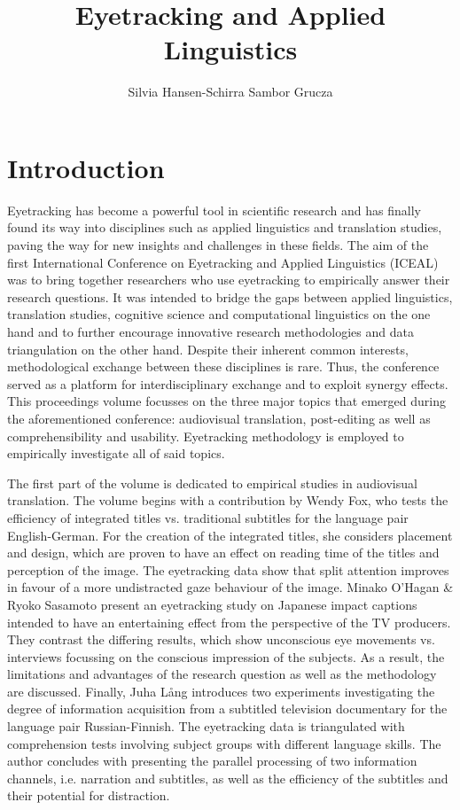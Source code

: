 \documentclass[output=paper]{langsci/langscibook}
\author{%
Silvia Hansen-Schirra\affiliation{Johannes Gutenberg University of Mainz in Germersheim}%
\lastand
Sambor Grucza \affiliation{University of Warsaw}
}
\title{Eyetracking and Applied Linguistics}
\begin{document}
\section{Introduction}

Eyetracking has become a powerful tool in scientific research and has finally found its way into disciplines such as applied linguistics and translation studies, paving the way for new insights and challenges in these fields. The aim of the first International Conference on Eyetracking and Applied Linguistics (ICEAL) was to bring together researchers who use eyetracking to empirically answer their research questions. It was intended to bridge the gaps between applied linguistics, translation studies, cognitive science and computational linguistics on the one hand and to further encourage innovative research methodologies and data triangulation on the other hand. Despite their inherent common interests, methodological exchange between these disciplines is rare. Thus, the conference served as a platform for interdisciplinary exchange and to exploit synergy effects. This proceedings volume focusses on the three major topics that emerged during the aforementioned conference: audiovisual translation, post-editing as well as comprehensibility and usability. Eyetracking methodology is employed to empirically investigate all of said topics. 

The first part of the volume is dedicated to empirical studies in audiovisual translation. The volume begins with a contribution by Wendy Fox, who tests the efficiency of integrated titles vs. traditional subtitles for the language pair English-German. For the creation of the integrated titles, she considers placement and design, which are proven to have an effect on reading time of the titles and perception of the image. The eyetracking data show that split attention improves in favour of a more undistracted gaze behaviour of the image. Minako O’Hagan \& Ryoko Sasamoto present an eyetracking study on Japanese impact captions intended to have an entertaining effect from the perspective of the TV producers. They contrast the differing results, which show unconscious eye movements vs. interviews focussing on the conscious impression of the subjects. As a result, the limitations and advantages of the research question as well as the methodology are discussed. Finally, Juha Lång introduces two experiments investigating the degree of information acquisition from a subtitled television documentary for the language pair Russian-Finnish. The eyetracking data is triangulated with comprehension tests involving subject groups with different language skills. The author concludes with presenting the parallel processing of two information channels, i.e. narration and subtitles, as well as the efficiency of the subtitles and their potential for distraction.
\end{document}
